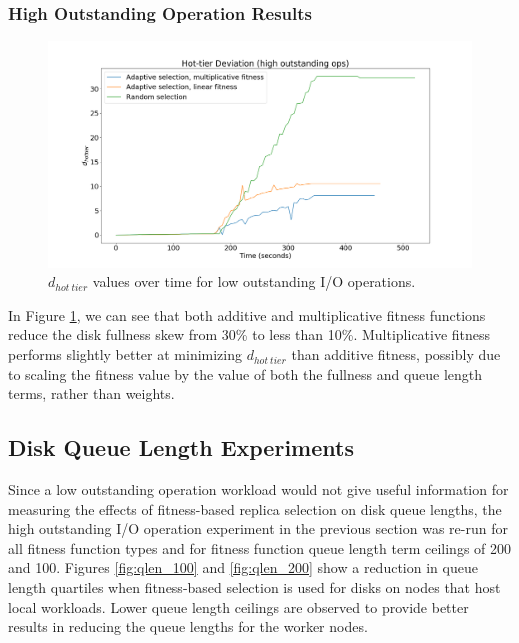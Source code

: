 \documentclass[12pt]{article}
\begin{document}
    \subsubsection{High Outstanding Operation Results}

    \begin{figure}[h]
      \centering
      \includegraphics[scale=0.32]{images/high_outstanding_exp.png} 
      \caption{$d_{hot\ tier}$ values over time for low outstanding I/O
               operations.}
      \label{fig:high_outstanding_tier_disparity}
    \end{figure}


    In Figure \ref{fig:high_outstanding_tier_disparity}, we can see that both
    additive and multiplicative fitness functions reduce the disk fullness skew
    from 30\% to less than 10\%. Multiplicative fitness performs slightly
    better at minimizing $d_{hot\ tier}$ than additive fitness, possibly due to
    scaling the fitness value by the value of both the fullness and queue
    length terms, rather than weights.
  
  \subsection{Disk Queue Length Experiments}

  Since a low outstanding operation workload would not give useful
  information for measuring the effects of fitness-based replica selection on
  disk queue lengths, the high outstanding I/O operation experiment in the
  previous section was re-run for all fitness function types and for fitness
  function queue length term ceilings of 200 and 100. Figures
  \ref{fig:qlen_100} and \ref{fig:qlen_200} show a reduction in
  queue length quartiles when fitness-based selection is used for disks on
  nodes that host local workloads. Lower queue length ceilings are
  observed to provide better results in reducing the queue lengths for the
  worker nodes.
\end{document}
